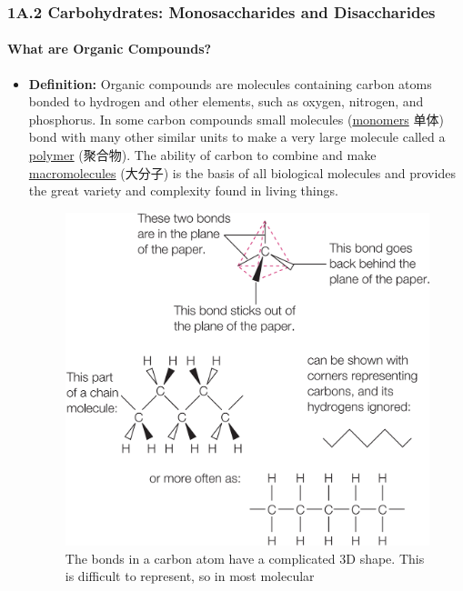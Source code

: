 
\subsubsection{1A.2 Carbohydrates: Monosaccharides and Disaccharides}
\paragraph{What are Organic Compounds?}
\begin{itemize}
    \item \textbf{Definition:} Organic compounds are molecules containing carbon atoms bonded to hydrogen and other elements, such
    as oxygen, nitrogen, and phosphorus. In some carbon compounds small molecules (\underline{monomers} 单体) bond with many
    other similar units to make a very large molecule called a \underline{polymer} (聚合物). The ability of carbon to combine and
    make \underline{macromolecules} (大分子) is the basis of all biological molecules and provides the great variety and
    complexity found in living things.
    \begin{figure}[H]
        \centering
        \includegraphics[scale=0.155]{Biology/1A/Images/1A-2-1.png}
        \caption{The bonds in a carbon atom have a complicated 3D shape. This is difficult to represent, so in most molecular
}
\end{figure}
\end{itemize}
